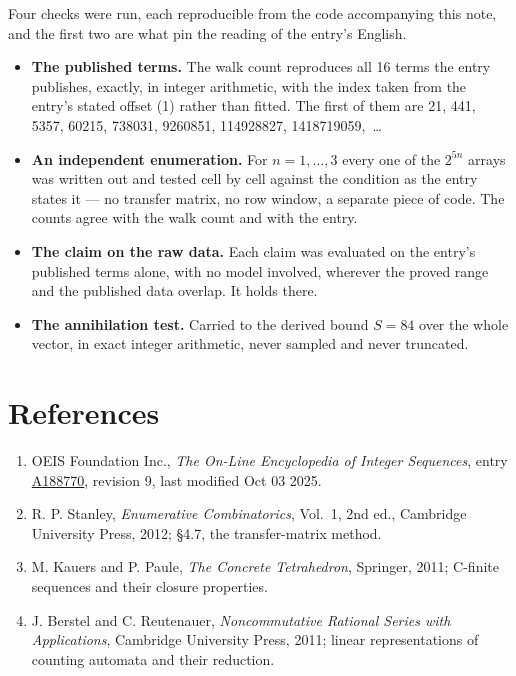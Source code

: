 \documentclass[11pt]{article}
\theoremstyle{definition}
\begin{document}
Four checks were run, each reproducible from the code accompanying this note, and the first two are what pin the reading of the entry's English.

\begin{itemize}

\item {\bfseries The published terms.} The walk count reproduces all 16 terms the entry publishes, exactly, in integer arithmetic, with the index taken from the entry's stated offset (1) rather than fitted. The first of them are 21, 441, 5357, 60215, 738031, 9260851, 114928827, 1418719059,~\dots

\item {\bfseries An independent enumeration.} For $n = 1,\dots,3$ every one of the $2^{5n}$ arrays was written out and tested cell by cell against the condition as the entry states it --- no transfer matrix, no row window, a separate piece of code. The counts agree with the walk count and with the entry.

\item {\bfseries The claim on the raw data.} Each claim was evaluated on the entry's published terms alone, with no model involved, wherever the proved range and the published data overlap. It holds there.

\item {\bfseries The annihilation test.} Carried to the derived bound $S = 84$ over the whole vector, in exact integer arithmetic, never sampled and never truncated.

\end{itemize}

\section{References}

\begin{enumerate}

\item OEIS Foundation Inc., \emph{The On-Line Encyclopedia of Integer Sequences}, entry \href{https://oeis.org/A188770}{A188770}, revision 9, last modified Oct 03 2025.

\item R. P. Stanley, \emph{Enumerative Combinatorics}, Vol.~1, 2nd ed., Cambridge University Press, 2012; \S4.7, the transfer-matrix method.

\item M. Kauers and P. Paule, \emph{The Concrete Tetrahedron}, Springer, 2011; C-finite sequences and their closure properties.

\item J. Berstel and C. Reutenauer, \emph{Noncommutative Rational Series with Applications}, Cambridge University Press, 2011; linear representations of counting automata and their reduction.

\end{enumerate}
\end{document}
